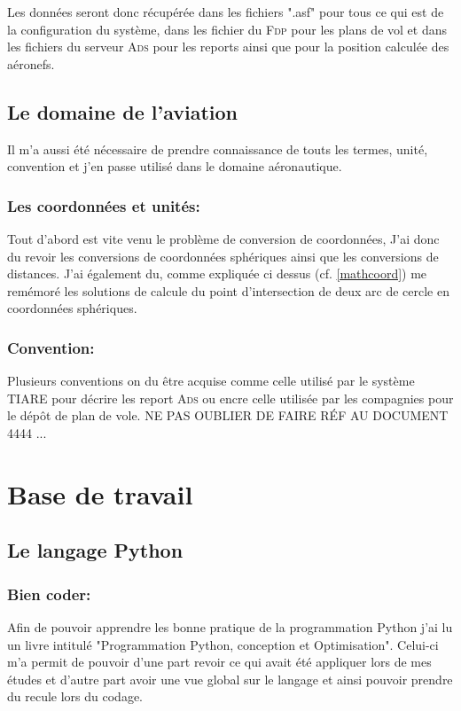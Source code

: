 Les données seront donc récupérée dans les fichiers ".asf" pour tous ce qui est de la configuration du système, dans les fichier du \textsc{Fdp} pour les plans de vol et dans les fichiers du serveur \textsc{Ads} pour les reports ainsi que pour la position calculée des aéronefs.

    \subsection{Le domaine de l'aviation}
Il m'a aussi été nécessaire de prendre connaissance de touts les termes, unité, convention et j'en passe utilisé dans le domaine aéronautique.

        \subsubsection{Les coordonnées et unités:}
Tout d'abord est vite venu le problème de conversion de coordonnées, J'ai donc du revoir les conversions de coordonnées sphériques ainsi que les conversions de distances.
J'ai également du, comme expliquée ci dessus (cf. \vref{mathcoord})
me remémoré les solutions de calcule du point d'intersection de deux arc de cercle en coordonnées sphériques.

        \subsubsection{Convention:}
Plusieurs conventions on du être acquise comme celle utilisé par le système TIARE pour décrire les report \textsc{Ads} ou encre celle utilisée par les compagnies pour le dépôt de plan de vole.
NE PAS OUBLIER DE FAIRE RÉF AU DOCUMENT 4444 ...





\section{Base de travail}
    \subsection{Le langage Python}
        \subsubsection{Bien coder:\label{pygood}}
Afin de pouvoir apprendre les bonne pratique de la programmation Python j'ai lu un livre intitulé "Programmation Python, conception et Optimisation"\cite{pybook}. Celui-ci m'a permit de pouvoir d'une part revoir ce qui avait été appliquer lors de mes études et d'autre part avoir une vue global sur le langage et ainsi pouvoir prendre du recule lors du codage.

